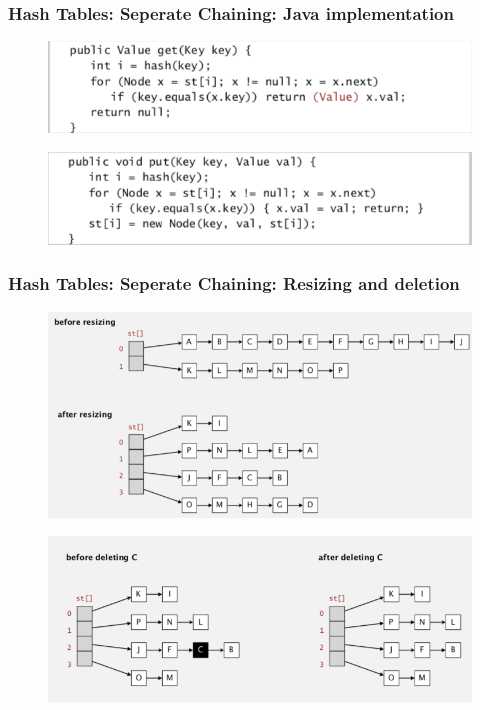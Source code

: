 \documentclass[11pt]{beamer}
\begin{document}
       \begin{frame}
     	\frametitle{Hash Tables: Seperate Chaining: Java implementation}	
         	\begin{figure}
         		\centering
         		\includegraphics[width=1\linewidth]{"Screenshot 2020-11-29 at 11.28.34 PM"}
         		\label{fig:screenshot-2020-11-29-at-11}
         	\end{figure}
         	\begin{figure}
         		\centering
         		\includegraphics[width=1\linewidth]{"Screenshot 2020-11-29 at 11.28.43 PM"}
         		\label{fig:screenshot-2020-11-29-at-11}
         	\end{figure}    	
     \end{frame}
 
         \begin{frame}
     	\frametitle{Hash Tables: Seperate Chaining: Resizing and deletion}	
         	\begin{figure}
         		\centering
         		\includegraphics[width=0.75\linewidth]{"Screenshot 2020-11-29 at 11.29.12 PM"}
         		\label{fig:screenshot-2020-11-29-at-11}
         	\end{figure}
         	\begin{figure}
         		\centering
         		\includegraphics[width=0.75\linewidth]{"Screenshot 2020-11-29 at 11.29.44 PM"}
         		\label{fig:screenshot-2020-11-29-at-11}
         	\end{figure}  	
     \end{frame}
 
\end{document}
